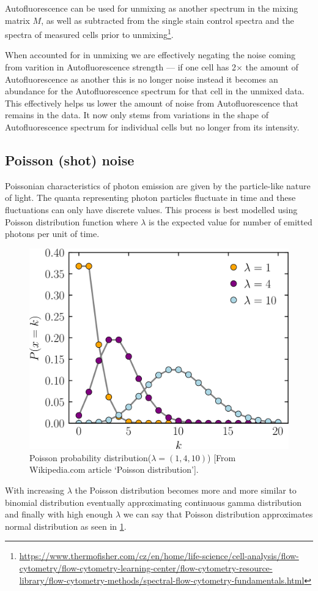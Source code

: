 Autofluorescence can be used for unmixing as another spectrum in the mixing matrix $M$, as well as subtracted from the single stain control spectra and the spectra of measured cells prior to unmixing\footnote{\url{https://www.thermofisher.com/cz/en/home/life-science/cell-analysis/flow-cytometry/flow-cytometry-learning-center/flow-cytometry-resource-library/flow-cytometry-methods/spectral-flow-cytometry-fundamentals.html}}. 


When accounted for in unmixing we are effectively negating the noise coming from varition in Autofluorescence strength --- if one cell has 2$\times$ the amount of Autofluorescence as another this is no longer noise instead it becomes an abundance for the Autofluorescence spectrum for that cell in the unmixed data. This effectively helps us lower the amount of noise from Autofluorescence that remains in the data. It now only stems from variations in the shape of Autofluorescence spectrum for individual cells but no longer from its intensity\footnotemark[3]. 

\newpage
\subsection{Poisson (shot) noise}
Poissonian characteristics of photon emission are given by the particle-like nature of light.
The quanta representing photon particles fluctuate in time and these fluctuations can only have discrete values.
This process is best modelled using Poisson distribution function where $\lambda$ is the expected value for number of emitted photons per unit of time\cite{MandelPoisStat1959}.
\begin{figure}
  \includegraphics[width=0.7\linewidth]{img/poisson.png}
  \caption{Poisson probability distribution($\lambda=(1,4,10)$) [From Wikipedia.com article `Poisson distribution'].}
  \label{fig:pois}
\end{figure}
 With increasing $\lambda$ the Poisson distribution becomes more and more similar to binomial distribution eventually approximating continuous gamma distribution and finally with high enough $\lambda$ we can say that Poisson distribution approximates normal distribution as seen in \cref{fig:pois}.

